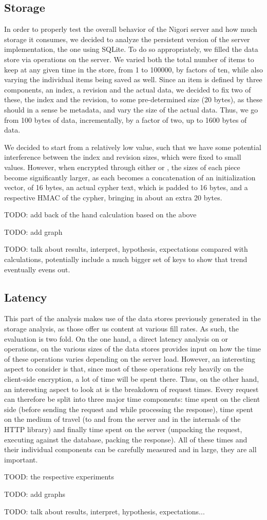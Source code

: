 \subsection{Storage}
In order to properly test the overall behavior of the Nigori server and how much storage it consumes, we decided to analyze the persistent version of the server implementation, the one using SQLite.
To do so appropriately, we filled the data store via  operations on the server.
We varied both the total number of items to keep at any given time in the store, from 1 to 100000, by factors of ten, while also varying the individual items being saved as well.
Since an item is defined by three components, an index, a revision and the actual data, we decided to fix two of these, the index and the revision, to some pre-determined size (20 bytes), as these should in a sense be metadata, and vary the size of the actual data.
Thus, we go from 100 bytes of data, incrementally, by a factor of two, up to 1600 bytes of data.

We decided to start from a relatively low value, such that we have some potential interference between the index and revision sizes, which were fixed to small values.
However, when encrypted through either  or , the sizes of each piece become significantly larger, as each becomes a concatenation of an  initialization vector, of 16 bytes, an actual  cypher text, which is padded to 16 bytes, and a respective HMAC of the cypher, bringing in about an extra 20 bytes.

TODO: add back of the hand calculation based on the above

TODO: add graph

TODO: talk about results, interpret, hypothesis, expectations compared with calculations, potentially include a much bigger set of keys to show that trend eventually evens out.

\subsection{Latency}
This part of the analysis makes use of the data stores previously generated in the storage analysis, as those offer us content at various fill rates.
As such, the evaluation is two fold.
On the one hand, a direct latency analysis on  or  operations, on the various sizes of the data stores provides input on how the time of these operations varies depending on the server load.
However, an interesting aspect to consider is that, since most of these operations rely heavily on the client-side encryption, a lot of time will be spent there.
Thus, on the other hand, an interesting aspect to look at is the breakdown of request times.
Every request can therefore be split into three major time components: time spent on the client side (before sending the request and while processing the response), time spent on the medium of travel (to and from the server and in the internals of the HTTP library) and finally time spent on the server (unpacking the request, executing against the database, packing the response).
All of these times and their individual components can be carefully measured and in large, they are all important.

TOOD: the respective experiments

TODO: add graphs

TODO: talk about results, interpret, hypothesis, expectations...
